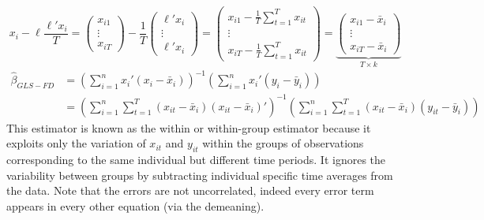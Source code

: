\documentclass[DIV=14,titlepage=false]{scrreprt}
\begin{document}
\[x_i - \ell\frac{\ell'x_i}{T} = \begin{pmatrix}
    x_{i1} \\
    \vdots \\
    x_{iT}
\end{pmatrix}
- \frac{1}{T}\begin{pmatrix}
    \ell'x_i \\
    \vdots \\
    \ell'x_i 
\end{pmatrix}
= \begin{pmatrix}
    x_{i1} - \frac{1}{T}\sum_{t=1}^{T}x_{it} \\
    \vdots \\
    x_{iT} - \frac{1}{T}\sum_{t=1}^{T}x_{it}
\end{pmatrix} = \underbrace{\begin{pmatrix}
    x_{i1} - \bar x_i \\
    \vdots \\
    x_{iT} - \bar x_i
\end{pmatrix}}_{T \times k}
\]
\begin{align*}
    \hat \beta_{GLS-FD} &=\left(\sum_{i=1}^{n}x_i'(x_i -\bar x_i)\right)^{-1} \left(\sum_{i=1}^{n}x_i'(y_i - \bar y_i)\right) \\
    &= \left(\sum_{i=1}^{n}\sum_{t=1}^{T}(x_{it} -\bar x_i)(x_{it} -\bar x_i)'\right)^{-1} \left(\sum_{i=1}^{n}\sum_{t=1}^{T}(x_{it} -\bar x_i)(y_{it} - \bar y_i)\right) 
\end{align*}
This estimator is known as the within or within-group estimator because it exploits only the variation of $x_{it}$ and $y_{it}$ within the groups of observations corresponding to the same individual but different time periods. It ignores the variability between groups by subtracting individual specific time averages from the data. Note that the errors are not uncorrelated, indeed every error term appears in every other equation (via the demeaning).\\
\end{document}
